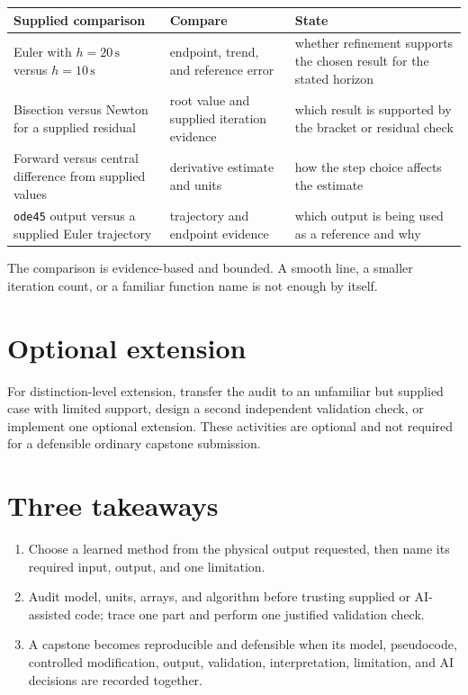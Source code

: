 \documentclass[11pt,a4paper]{article}
\newcommand{\units}[1]{\,\mathrm{#1}}
\begin{document}
\begin{center}\small
\begin{tabular}{>{\raggedright\arraybackslash}p{.27\linewidth}>{\raggedright\arraybackslash}p{.30\linewidth}>{\raggedright\arraybackslash}p{.32\linewidth}}
\toprule
\textbf{Supplied comparison} & \textbf{Compare} & \textbf{State} \\
\midrule
Euler with $h=20\units{s}$ versus $h=10\units{s}$ & endpoint, trend, and reference error & whether refinement supports the chosen result for the stated horizon \\
Bisection versus Newton for a supplied residual & root value and supplied iteration evidence & which result is supported by the bracket or residual check \\
Forward versus central difference from supplied values & derivative estimate and units & how the step choice affects the estimate \\
\texttt{ode45} output versus a supplied Euler trajectory & trajectory and endpoint evidence & which output is being used as a reference and why \\
\bottomrule
\end{tabular}
\end{center}

The comparison is evidence-based and bounded. A smooth line, a smaller iteration count, or a familiar function name is not enough by itself.

\section*{Optional extension}
For distinction-level extension, transfer the audit to an unfamiliar but supplied case with limited support, design a second independent validation check, or implement one optional extension. These activities are optional and not required for a defensible ordinary capstone submission.

\section*{Three takeaways}
\begin{enumerate}[nosep,leftmargin=6mm]
\item Choose a learned method from the physical output requested, then name its required input, output, and one limitation.
\item Audit model, units, arrays, and algorithm before trusting supplied or AI-assisted code; trace one part and perform one justified validation check.
\item A capstone becomes reproducible and defensible when its model, pseudocode, controlled modification, output, validation, interpretation, limitation, and AI decisions are recorded together.
\end{enumerate}
\end{document}
